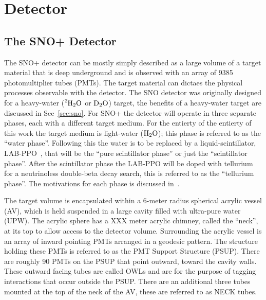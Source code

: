 
\chapter{Detector}

\ifpdf
    \graphicspath{{detector/figures/PNG/}{detector/figures/PDF/}{detector/figures/}}
\else
    \graphicspath{{detector/figures/EPS/}{detector/figures/}}
\fi


\section{The SNO+ Detector}
The SNO+ detector can be mostly simply described as a large volume of a
target material that is deep underground and is observed with an array of
9385  photomultiplier tubes (PMTs).
The target material can dictaes the physical processes
observable with the detector.
The SNO detector was originally designed for a heavy-water ($\ce{^{2}H_{2}O}$ or $\ce{D_{2}O}$)
target, the benefits of a heavy-water target are discussed in Sec~\ref{sec:sno}.
For SNO+ the detector will operate in three separate phases, each with a different
target medium.
For the entierty of the entierty of  this work the target medium is
light-water ($\ce{H_{2}O}$); this phase is referred to as the ``water phase''.
Following this the water is to be replaced by a liquid-scintillator, LAB-PPO~\cite{mchen_labppo},
that will be the ``pure scintillator phase'' or just the ``scintillator phase''.
After the scintillator phase the LAB-PPO will be doped with tellurium for
a neutrinoless double-beta decay search, this is referred to as the ``tellurium phase''.
The motivations for each phase is discussed in~\cite{status_and_prospects}.

The target volume is encapsulated within a 6-meter radius spherical acrylic vessel (AV),
which is held suspended in a large cavity filled with ultra-pure water (UPW)\@.
The acrylic sphere has a XXX meter acrylic chimney, called the ``neck'', at its top
to allow access to the detector volume.
Surrounding the acrylic vessel is an  array of inward pointing PMTs
arranged in a geodesic pattern.
The structure holding these PMTs is referred to as the PMT Support Structure
(PSUP).
There are roughly 90 PMTs on the PSUP that point outward, toward the cavity
walls.
These outward facing tubes are called OWLs and are for the purpose of tagging
interactions that occur outside the PSUP\@.
There are an additional three tubes mounted at the top of the neck of the AV,
these are referred to as NECK tubes.

